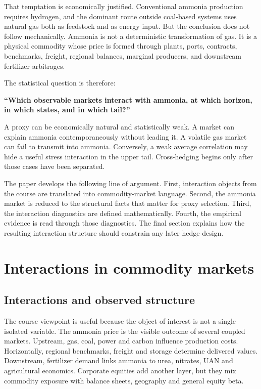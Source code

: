 \documentclass[11pt]{article}
\newcommand{\1}{\mathbf 1}
\begin{document}
That temptation is economically justified. Conventional ammonia production requires hydrogen, and the dominant route outside coal-based systems uses natural gas both as feedstock and as energy input. But the conclusion does not follow mechanically. Ammonia is not a deterministic transformation of gas. It is a physical commodity whose price is formed through plants, ports, contracts, benchmarks, freight, regional balances, marginal producers, and downstream fertilizer arbitrages.


The statistical question is therefore:

\begin{center}
\textbf{``Which observable markets interact with ammonia, 
at which horizon, in which states, and in which tail?''}
\end{center}

A proxy can be economically natural and statistically weak. A market can explain ammonia contemporaneously without leading it. A volatile gas market can fail to transmit into ammonia. Conversely, a weak average correlation may hide a useful stress interaction in the upper tail. Cross-hedging begins only after those cases have been separated.

The paper develops the following line of argument. First, interaction objects from the course are translated into commodity-market language. Second, the ammonia market is reduced to the structural facts that matter for proxy selection. Third, the interaction diagnostics are defined mathematically. Fourth, the empirical evidence is read through those diagnostics. The final section explains how the resulting interaction structure should constrain any later hedge design.

\section{Interactions in commodity markets}

\subsection{Interactions and observed structure}

The course viewpoint is useful because the object of interest is not a single isolated variable. The ammonia price is the visible outcome of several coupled markets. Upstream, gas, coal, power and carbon influence production costs. Horizontally, regional benchmarks, freight and storage determine delivered values. Downstream, fertilizer demand links ammonia to urea, nitrates, UAN and agricultural economics. Corporate equities add another layer, but they mix commodity exposure with balance sheets, geography and general equity beta.
\end{document}
